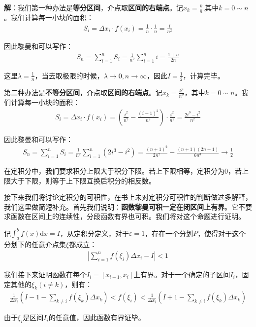 \documentclass{ctexart}
\let\oldtextbf\textbf %
\renewcommand{\textbf}[1]{\textcolor{btex}{\oldtextbf{#1}}} %
\begin{document}
\textbf{解}：我们第一种办法是\textbf{等分区间}，介点取\textbf{区间的右端点}。记$x_k=\frac{k}{n}$,其中$k=0\sim n$。我们计算每一小块的面积：
\begin{align*}
    S_i=\Delta x_i\cdot f(x_i)=\frac{1}{n}\cdot \frac{i}{n}=\frac{i}{n^2}
\end{align*}

因此黎曼和可以写作：
\begin{align*}
    S_n=\sum_{i=1}^nS_i=\frac{1}{n^2}\sum_{i=1}^n i=\frac{1+n}{2n}
\end{align*}

这里$\lambda=\frac{1}{n}$，当去取极限的时候，$\lambda\to 0,n\to \infty$，因此$I=\frac{1}{2}$，计算完毕。

第二种办法是\textbf{不等分区间}，介点取\textbf{区间的右端点}。记$x_k=\frac{k^2}{n^2}$，其中$k=0\sim n$。我们计算每一小块的面积：
\begin{align*}
    S_i=\Delta{x_i}\cdot f(x_{i})=(\frac{i^2}{n^2}-\frac{(i-1)^2}{n^2})\cdot\frac{i^2}{n^2}=\frac{2i^3-i^2}{n^2}
\end{align*}

因此黎曼和可以写作：
\begin{align*}
    S_n=\sum_{i=1}^nS_i=\frac{1}{n^2}\sum_{i=1}^n (2i^3-i^2)=\frac{(n+1)^2}{2n^2}-\frac{(n+1)(2n+1)}{6n^3}\to\frac{1}{2}
\end{align*}

在定积分中，我们要求积分上限大于积分下限。若上下限相等，定积分为0，若上限大于下限，则等于上下限互换后积分的相反数。

接下来我们将讨论定积分的可积性，在书上未对定积分可积性的判断做过多解释，我们这里做简短补充。首先我们说明：\textbf{函数黎曼可积一定在闭区间上有界}。它不要求函数在区间上的连续性，分段函数有界也可积。我们将对这个命题进行证明。

记$\int_a^b f(x)\mathrm{d}x=I$，从定积分定义，对于$\varepsilon=1$，存在一个分划$P$，使得对于这个分划下的任意介点集$\xi$都成立：
\begin{align*}
   | \sum_{i=1}^n f(\xi_i)\Delta x_i-I|<1
\end{align*}

我们接下来证明函数在每个$I_i=[x_{i-1},x_i]$上有界。对于一个确定的子区间$I_i$，固定其他的$\xi_k (i\neq k)$，则有：
\begin{align*}
    \frac{1}{\Delta x_i}(I-1-\sum_{k\neq i}f(\xi_k)\Delta x_k)<f(\xi_i)< \frac{1}{\Delta x_i}(I+1-\sum_{k\neq i}f(\xi_k)\Delta x_k)
\end{align*}

由于$\xi_i$是区间$I_i$的任意值，因此函数有界证毕。
\end{document}

